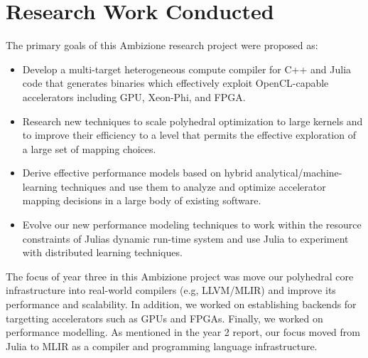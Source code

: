 \documentclass[11pt, manuscript,\review anonymous]{acmart}
\begin{document}
\maketitle
\newpage
\ifx\grammarly\grammarlyon 
\onecolumn 
\else 
\fi


\section{Research Work Conducted}

The primary goals of this Ambizione research project were proposed as:
\begin{itemize}
\item Develop a multi-target heterogeneous compute compiler for C++ and Julia code that generates binaries which effectively exploit
OpenCL-capable accelerators including GPU, Xeon-Phi, and FPGA.
\item Research new techniques to scale polyhedral optimization to large kernels and to improve their efficiency to a level that permits
the effective exploration of a large set of mapping choices.
\item Derive effective performance models based on hybrid analytical/machine-learning techniques and use them to analyze and optimize accelerator mapping decisions in a large body of existing software.
\item Evolve our new performance modeling techniques to work within the resource constraints of Julias dynamic run-time system and use Julia to experiment with distributed learning techniques.
\end{itemize}

The focus of year three in this Ambizione project was move our polyhedral core
infrastructure into real-world compilers (e.g, LLVM/MLIR) and improve its
performance and scalability. In addition, we worked on establishing backends
for targetting accelerators such as GPUs and FPGAs. Finally, we worked on
performance modelling. As mentioned in the year 2 report, our focus moved from
Julia to MLIR as a compiler and programming language infrastructure.
\end{document}
